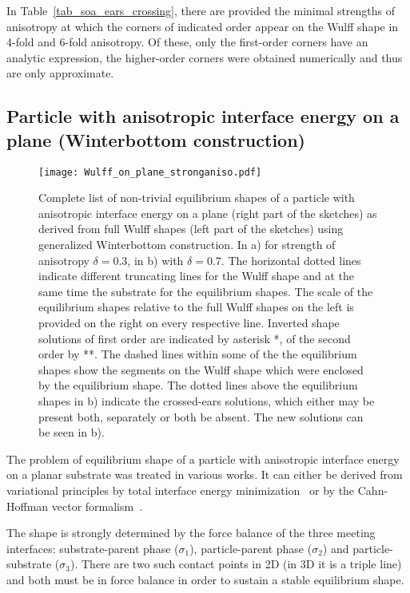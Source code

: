 	In Table~\ref{tab_soa_ears_crossing}, there are provided the minimal strengths of anisotropy at which the corners of indicated order appear on the Wulff shape in 4-fold and 6-fold anisotropy. Of these, only the first-order corners have an analytic expression, the higher-order corners were obtained numerically and thus are only approximate.
	
	\subsection{Particle with anisotropic interface energy on a plane (Winterbottom construction)}
	\begin{figure*}[h]
		\centering
		\texttt{[image: Wulff\_on\_plane\_stronganiso.pdf]}
		\caption{Complete list of non-trivial equilibrium shapes of a particle with anisotropic interface energy on a plane (right part of the sketches) as derived from full Wulff shapes (left part of the sketches) using generalized Winterbottom construction. In a) for strength of anisotropy $\delta=0.3$, in b) with $\delta=0.7$. The horizontal dotted lines indicate different truncating lines for the Wulff shape and at the same time the substrate for the equilibrium shapes. The scale of the equilibrium shapes relative to the full Wulff shapes on the left is provided on the right on every respective line. Inverted shape solutions of first order are indicated by asterisk *, of the second order by **. The dashed lines within some of the the equilibrium shapes show the segments on the Wulff shape which were enclosed by the equilibrium shape. The dotted lines above the equilibrium shapes in b) indicate the crossed-ears solutions, which either may be present both, separately or both be absent. The new solutions can be seen in b).}
		\label{fig_wulffonplane_solutions_sketches}
	\end{figure*}
	The problem of equilibrium shape of a particle with anisotropic interface energy on a planar substrate was treated in various works. It can either be derived from variational principles by total interface energy minimization~\cite{Winterbottom1967, Mariaux2011} or by the Cahn-Hoffman vector formalism~\cite{Cahn1974}. 
	
	The shape is strongly determined by the force balance of the three meeting interfaces: substrate-parent phase ($\sigma_1$), particle-parent phase ($\sigma_2$) and particle-substrate ($\sigma_3$). There are two such contact points in 2D (in 3D it is a triple line) and both must be in force balance in order to sustain a stable equilibrium shape. 
	
